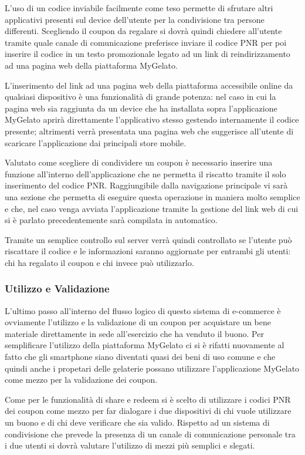 L'uso di un codice inviabile facilmente come teso permette di sfrutare altri applicativi presenti sul device dell'utente per la condivisione tra persone differenti.
Scegliendo il coupon da regalare si dovrà quindi chiedere all'utente tramite quale canale di comunicazione preferisce inviare il codice PNR per poi inserire il codice in un testo promozionale legato ad un link di reindirizzamento ad una pagina web della piattaforma MyGelato.

L'inserimento del link ad una pagina web della piattaforma accessibile online da qualsiasi dispositivo è una funzionalità di grande potenza: nel caso in cui la pagina web sia raggiunta da un device che ha installata sopra l'applicazione MyGelato aprirà direttamente l'applicativo stesso gestendo internamente il codice presente; altrimenti verrà presentata una pagina web che suggerisce all'utente di scaricare l'applicazione dai principali store mobile.

Valutato come scegliere di condividere un coupon è necessario inserire una funzione all'interno dell'applicazione che ne permetta il riscatto tramite il solo inserimento del codice PNR.
Raggiungibile dalla navigazione principale vi sarà una sezione che permetta di eseguire questa operazione in maniera molto semplice e che, nel caso venga avviata l'applicazione tramite la gestione del link web di cui si è parlato precedentemente sarà compilata in automatico.

Tramite un semplice controllo sul server verrà quindi controllato se l'utente può riscattare il codice e le informazioni saranno aggiornate per entrambi gli utenti: chi ha regalato il coupon e chi invece può utilizzarlo.

\subsubsection{Utilizzo e Validazione}
L'ultimo passo all'interno del flusso logico di questo sistema di e-commerce è ovviamente l'utilizzo e la validazione di un coupon per acquistare un bene materiale direttamente in sede all'esercizio che ha venduto il buono.
Per semplificare l'utilizzo della piattaforma MyGelato ci si è rifatti nuovamente al fatto che gli smartphone siano diventati quasi dei beni di uso comune e che quindi anche i propetari delle gelaterie possano utilizzare l'applicazione MyGelato come mezzo per la validazione dei coupon.

Come per le funzionalità di share e redeem si è scelto di utilizzare i codici PNR dei coupon come mezzo per far dialogare i due dispositivi di chi vuole utilizzare un buono e di chi deve verificare che sia valido.
Rispetto ad un sistema di condivisione che prevede la presenza di un canale di comunicazione personale tra i due utenti si dovrà valutare l'utilizzo di mezzi più semplici e slegati.

